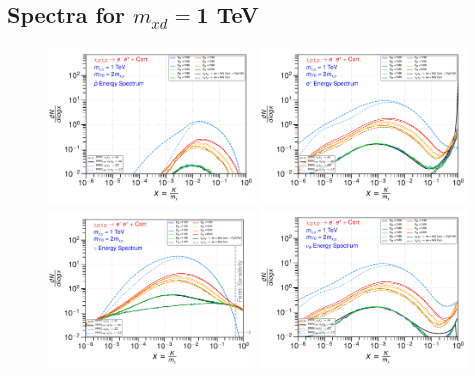 \documentclass[epj,nopacs,fleqn]{svjour}
\begin{document}
\subsection{Spectra for $m_{xd}=$1 TeV}
\begin{figure}[!h]
	\centering
	\subfigure
	{ \includegraphics[width=0.49\textwidth]{Fig/xdxd_ee_eeZ_eveW/1_antiprotons_ee_eeZ_eveW_1.pdf}}
	\subfigure
	{ \includegraphics[width=0.49\textwidth]{Fig/xdxd_ee_eeZ_eveW/1_positrons_ee_eeZ_eveW_1.pdf}}
	\subfigure
	{ \includegraphics[width=0.49\textwidth]{Fig/xdxd_ee_eeZ_eveW/1_gammas_ee_eeZ_eveW_1.pdf}}
	\subfigure
	{ \includegraphics[width=0.49\textwidth]{Fig/xdxd_ee_eeZ_eveW/1_neutrinos_e_ee_eeZ_eveW_1.pdf}}

\end{figure}
\end{document}
